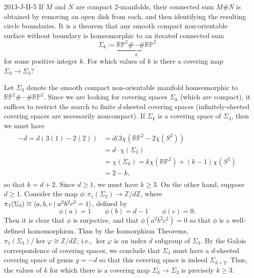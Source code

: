 \documentclass{article}
\begin{document}
	\begin{prb}{2013-J-II-5}
		If $M$ and $N$ are compact 2-manifolds, their connected sum $M\#N$ is obtained by removing an open disk from each, and then identifying the resulting circle boundaries. It is a theorem that any smooth compact non-orientable surface without boundary is homeomorphic to an iterated connected sum
		\begin{equation*}
			\Sigma_{k} \coloneqq \underbrace{\mathbb{RP}^{2}\#\dotsm \# \mathbb{RP}^{2}}_{k}
		\end{equation*}
		for some positive integer $k$. For which values of $k$ is there a covering map $\Sigma_{k} \to \Sigma_{3}$? 
	\end{prb}
	Let $\Sigma_{3}$ denote the smooth compact non-orientable manifold homeomorphic to  $\mathbb{RP}^{2}\#\dotsm \#\mathbb{RP}^{2}$. Since we are looking for covering spaces $\Sigma_{k}$ (which are compact), it suffices to restrict the search to finite $d$-sheeted covering spaces (infinitely-sheeted covering spaces are necessarily noncompact). If $\Sigma_{k}$ is a covering space of $\Sigma_{3}$, then we must have 
	\begin{align*}
		\begin{split}
			-d = d(3(1) - 2(2)) &= d(3\chi(\mathbb{RP}^{2} - 2\chi(S^{2})) \\
			&= d\cdot \chi(\Sigma_{3}) \\
			&= \chi(\Sigma_{k}) = k\chi(\mathbb{RP}^{2}) + (k - 1)\chi(S^{2}) \\
			&= 2 - k, 
		\end{split}
	\end{align*}
	so that $k = d + 2$. Since $d \geq 1$, we must have $k \geq 3$. On the other hand, suppose $d \geq 1$. Consider the map $\phi: \pi_{1}(\Sigma_{3}) \to \mathbb{Z}/d\mathbb{Z}$, where $\pi_{1}(\Sigma_{3}) \cong \braket{a, b, c \mid a^{2}b^{2}c^{2} = 1}$, defined by 
	\begin{equation*}
		\phi(a) = 1 \qquad \phi(b) = d - 1 \qquad \phi(c) = 0. 
	\end{equation*}
	Then it is clear that $\phi$ is surjective, and that $\phi(a^{2}b^{2}c^{2}) = 0$ so that $\phi$ is a well-defined homomorphism. Thus by the Isomorphism Theorems, $\pi_{1}(\Sigma_{3})/\ker{\varphi} \cong \mathbb{Z}/d\mathbb{Z}$; i.e., $\ker{\varphi}$ is an index $d$ subgroup of $\Sigma_{3}$. By the Galois correspondence of covering spaces, we conclude that $\Sigma_{3}$ must have a $d$-sheeted covering space of genus $g = -d$ so that this covering space is indeed $\Sigma_{d + 2}$. Thus, the values of $k$ for which there is a covering map $\Sigma_{k} \to \Sigma_{3}$ is precisely $k \geq 3$. 
	
\end{document}
